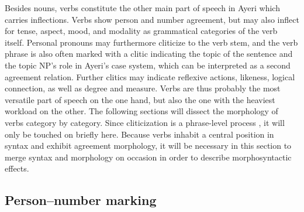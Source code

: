 Besides nouns, verbs constitute the other main part of speech in Ayeri which
carries inflections. Verbs show person and number agreement, but may also
inflect for tense, aspect, mood, and modality as grammatical categories of the
verb itself. Personal pronouns may furthermore cliticize to the verb stem, and
the verb phrase is also often marked with a clitic indicating the topic of the
sentence and the topic NP's role in Ayeri's case system, which can be
interpreted as a second agreement relation. Further clitics may indicate
reflexive actions, likeness, logical connection, as well as degree and measure.
Verbs are thus probably the most versatile part of speech on the one hand, but
also the one with the heaviest workload on the other. The following sections
will dissect the morphology of verbs category by category. Since cliticization
is a phrase-level process \citep{klavans1985}, it will only be touched on
briefly here. Because verbs inhabit a central position in syntax and exhibit
agreement morphology, it will be necessary in this section to merge syntax and
morphology on occasion in order to describe morphosyntactic effects.

\subsection{Person--number marking}
\label{subsec:persnumagr}

